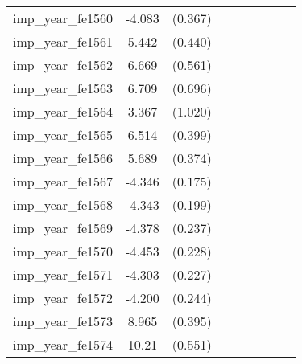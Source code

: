 {\begin{tabular}{l*{4}{cc}}
imp\_year\_fe1560&   -4.083\sym{***}&  (0.367)&                  &         &                  &         &                  &         \\
imp\_year\_fe1561&    5.442\sym{***}&  (0.440)&                  &         &                  &         &                  &         \\
imp\_year\_fe1562&    6.669\sym{***}&  (0.561)&                  &         &                  &         &                  &         \\
imp\_year\_fe1563&    6.709\sym{***}&  (0.696)&                  &         &                  &         &                  &         \\
imp\_year\_fe1564&    3.367\sym{***}&  (1.020)&                  &         &                  &         &                  &         \\
imp\_year\_fe1565&    6.514\sym{***}&  (0.399)&                  &         &                  &         &                  &         \\
imp\_year\_fe1566&    5.689\sym{***}&  (0.374)&                  &         &                  &         &                  &         \\
imp\_year\_fe1567&   -4.346\sym{***}&  (0.175)&                  &         &                  &         &                  &         \\
imp\_year\_fe1568&   -4.343\sym{***}&  (0.199)&                  &         &                  &         &                  &         \\
imp\_year\_fe1569&   -4.378\sym{***}&  (0.237)&                  &         &                  &         &                  &         \\
imp\_year\_fe1570&   -4.453\sym{***}&  (0.228)&                  &         &                  &         &                  &         \\
imp\_year\_fe1571&   -4.303\sym{***}&  (0.227)&                  &         &                  &         &                  &         \\
imp\_year\_fe1572&   -4.200\sym{***}&  (0.244)&                  &         &                  &         &                  &         \\
imp\_year\_fe1573&    8.965\sym{***}&  (0.395)&                  &         &                  &         &                  &         \\
imp\_year\_fe1574&    10.21\sym{***}&  (0.551)&                  &         &                  &         &                  &         \\

\end{tabular}}
